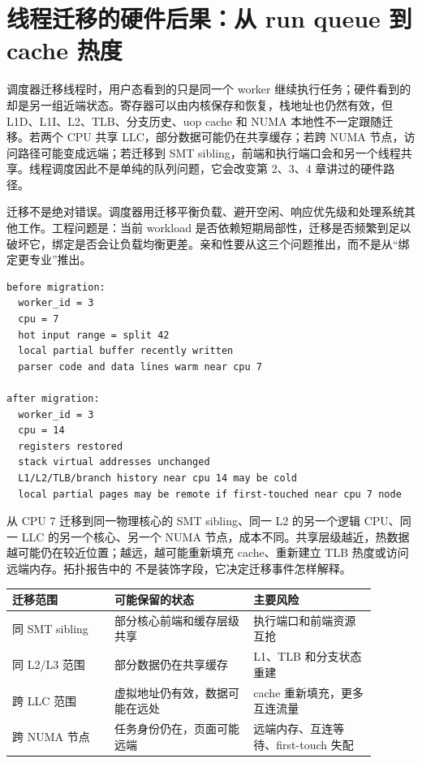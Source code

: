 \section{线程迁移的硬件后果：从 run queue 到 cache 热度}

调度器迁移线程时，用户态看到的只是同一个 worker 继续执行任务；硬件看到的却是另一组近端状态。寄存器可以由内核保存和恢复，栈地址也仍然有效，但 L1D、L1I、L2、TLB、分支历史、uop cache 和 NUMA 本地性不一定跟随迁移。若两个 CPU 共享 LLC，部分数据可能仍在共享缓存；若跨 NUMA 节点，访问路径可能变成远端；若迁移到 SMT sibling，前端和执行端口会和另一个线程共享。线程调度因此不是单纯的队列问题，它会改变第 2、3、4 章讲过的硬件路径。

迁移不是绝对错误。调度器用迁移平衡负载、避开空闲、响应优先级和处理系统其他工作。工程问题是：当前 workload 是否依赖短期局部性，迁移是否频繁到足以破坏它，绑定是否会让负载均衡更差。亲和性要从这三个问题推出，而不是从“绑定更专业”推出。

\begin{lstlisting}[numbers=none,caption={一次 worker 迁移后的状态账本}]
before migration:
  worker_id = 3
  cpu = 7
  hot input range = split 42
  local partial buffer recently written
  parser code and data lines warm near cpu 7

after migration:
  worker_id = 3
  cpu = 14
  registers restored
  stack virtual addresses unchanged
  L1/L2/TLB/branch history near cpu 14 may be cold
  local partial pages may be remote if first-touched near cpu 7 node
\end{lstlisting}

从 CPU 7 迁移到同一物理核心的 SMT sibling、同一 L2 的另一个逻辑 CPU、同一 LLC 的另一个核心、另一个 NUMA 节点，成本不同。共享层级越近，热数据越可能仍在较近位置；越远，越可能重新填充 cache、重新建立 TLB 热度或访问远端内存。拓扑报告中的  不是装饰字段，它决定迁移事件怎样解释。

\begin{center}
\small
\begin{tabular}{@{}p{0.25\linewidth}p{0.34\linewidth}p{0.30\linewidth}@{}}
\toprule
迁移范围 & 可能保留的状态 & 主要风险 \\
\midrule
同 SMT sibling & 部分核心前端和缓存层级共享 & 执行端口和前端资源互抢 \\
同 L2/L3 范围 & 部分数据仍在共享缓存 & L1、TLB 和分支状态重建 \\
跨 LLC 范围 & 虚拟地址仍有效，数据可能在远处 & cache 重新填充，更多互连流量 \\
跨 NUMA 节点 & 任务身份仍在，页面可能远端 & 远端内存、互连等待、first-touch 失配 \\
\bottomrule
\end{tabular}
\end{center}

